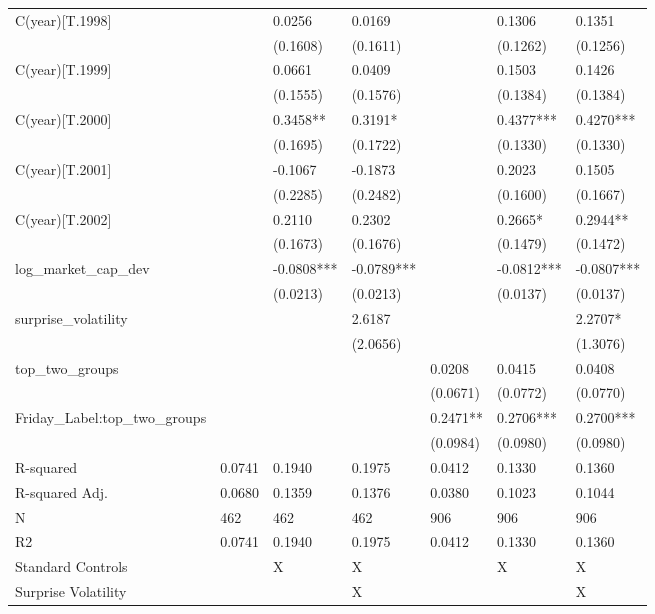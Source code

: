 \begin{tabular}{lllllll}
C(year)[T.1998] &  & 0.0256 & 0.0169 &  & 0.1306 & 0.1351 \\
 &  & (0.1608) & (0.1611) &  & (0.1262) & (0.1256) \\
C(year)[T.1999] &  & 0.0661 & 0.0409 &  & 0.1503 & 0.1426 \\
 &  & (0.1555) & (0.1576) &  & (0.1384) & (0.1384) \\
C(year)[T.2000] &  & 0.3458** & 0.3191* &  & 0.4377*** & 0.4270*** \\
 &  & (0.1695) & (0.1722) &  & (0.1330) & (0.1330) \\
C(year)[T.2001] &  & -0.1067 & -0.1873 &  & 0.2023 & 0.1505 \\
 &  & (0.2285) & (0.2482) &  & (0.1600) & (0.1667) \\
C(year)[T.2002] &  & 0.2110 & 0.2302 &  & 0.2665* & 0.2944** \\
 &  & (0.1673) & (0.1676) &  & (0.1479) & (0.1472) \\
log_market_cap_dev &  & -0.0808*** & -0.0789*** &  & -0.0812*** & -0.0807*** \\
 &  & (0.0213) & (0.0213) &  & (0.0137) & (0.0137) \\
surprise_volatility &  &  & 2.6187 &  &  & 2.2707* \\
 &  &  & (2.0656) &  &  & (1.3076) \\
top_two_groups &  &  &  & 0.0208 & 0.0415 & 0.0408 \\
 &  &  &  & (0.0671) & (0.0772) & (0.0770) \\
Friday_Label:top_two_groups &  &  &  & 0.2471** & 0.2706*** & 0.2700*** \\
 &  &  &  & (0.0984) & (0.0980) & (0.0980) \\
R-squared & 0.0741 & 0.1940 & 0.1975 & 0.0412 & 0.1330 & 0.1360 \\
R-squared Adj. & 0.0680 & 0.1359 & 0.1376 & 0.0380 & 0.1023 & 0.1044 \\
N & 462 & 462 & 462 & 906 & 906 & 906 \\
R2 & 0.0741 & 0.1940 & 0.1975 & 0.0412 & 0.1330 & 0.1360 \\
Standard Controls &  & X & X &  & X & X \\
Surprise Volatility &  &  & X &  &  & X \\
\bottomrule
\end{tabular}
